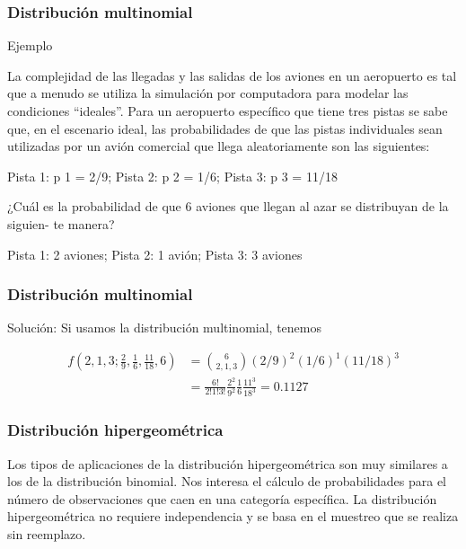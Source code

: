 \documentclass[spanish]{beamer}
\begin{document}
\begin{frame}
\frametitle{Distribución multinomial}  
Ejemplo

La complejidad de las llegadas y las salidas de los aviones en un aeropuerto es tal que a
menudo se utiliza la simulación por computadora para modelar las condiciones “ideales”. Para un aeropuerto específico que tiene tres pistas se sabe que, en el escenario ideal,
las probabilidades de que las pistas individuales sean utilizadas por un avión comercial
que llega aleatoriamente son las siguientes:
\begin{center}
Pista 1: p 1 = 2/9;
Pista 2: p 2 = 1/6;
Pista 3: p 3 = 11/18
\end{center}
¿Cuál es la probabilidad de que 6 aviones que llegan al azar se distribuyan de la siguien-
te manera?
\begin{center}
Pista 1: 2 aviones;
Pista 2: 1 avión;
Pista 3: 3 aviones
\end{center}
\end{frame}
\begin{frame}
\frametitle{Distribución multinomial}  
Solución: Si usamos la distribución multinomial, tenemos

\begin{equation*} \label{eq2}
\begin{split}
f(2,1,3; \frac{2}{9}, \frac{1}{6},\frac{11}{18}, 6) & = \binom{6}{2, 1, 3} (2/9)^{2} (1/6)^{1} (11/18)^{3} \\
 & = \frac{6!}{2!1!3!} \frac{2^2}{9^2} \frac{1}{6}\frac{11^3}{18^3}=0.1127
\end{split}
\end{equation*}

\end{frame}
\begin{frame}
\frametitle{Distribución hipergeométrica}  
Los tipos de aplicaciones de la distribución hipergeométrica son muy similares a los de la distribución binomial. Nos interesa el cálculo de probabilidades para el número de observaciones que caen en una categoría específica. La distribución hipergeométrica no requiere independencia y se basa en el muestreo que se realiza sin reemplazo.
\end{frame}
\end{document}
